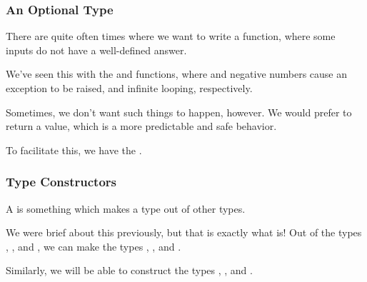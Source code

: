 \documentclass[aspectratio=169, handout]{beamer}
\begin{document}
\begin{frame}[fragile]
  \frametitle{An Optional Type}

  There are quite often times where we want to write a function, where some inputs
  do not have a well-defined answer.

  \pause
  \vspace{\fill}

  We've seen this with the  and  functions, where  and
  negative numbers cause an exception to be raised, and infinite looping, respectively.

  \pause
  \vspace{\fill}

  Sometimes, we don't want such things to happen, however. We would prefer to return
  a value, which is a more predictable and safe behavior.

  \pause
  \vspace{\fill}

  To facilitate this, we have the  .
\end{frame}

\begin{frame}[fragile]
  \frametitle{Type Constructors}

  A  is something which makes a type out of other types.

  \pause
  \vspace{\fill}

  We were brief about this previously, but that is exactly what  is!
  Out of the types , , and , we can make
  the types , , and .

  \pause
  \vspace{\fill}

  Similarly, we will be able to construct the types , ,
  and .
\end{frame}
\end{document}
